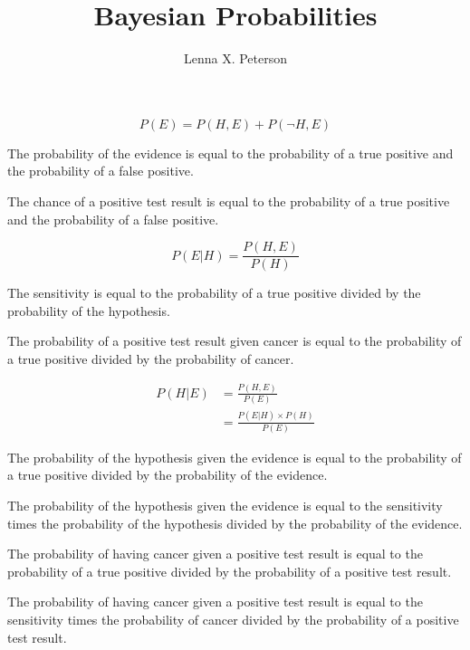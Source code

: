 \documentclass[12pt,a4paper]{article}
\author{Lenna X. Peterson}
\title{Bayesian Probabilities}
\begin{document}
\maketitle

\begin{equation}
P(E) = P(H,E) + P(\neg H, E)
\end{equation}

The probability of the evidence is equal to the probability of a true positive and the probability of a false positive.

The chance of a positive test result is equal to the probability of a true positive and the probability of a false positive.

\begin{equation}
P(E|H) = \frac{P(H,E)}{P(H)}
\end{equation}

The sensitivity is equal to the probability of a true positive divided by the probability of the hypothesis.

The probability of a positive test result given cancer is equal to the probability of a true positive divided by the probability of cancer.

\begin{align}
P(H|E) &= \frac{P(H,E)}{P(E)} \\
&= \frac{P(E|H) \times P(H)}{P(E)}
\end{align}

The probability of the hypothesis given the evidence is equal to the probability of a true positive divided by the probability of the evidence. 

The probability of the hypothesis given the evidence is equal to the sensitivity times the probability of the hypothesis divided by the probability of the evidence.

The probability of having cancer given a positive test result is equal to the probability of a true positive divided by the probability of a positive test result.

The probability of having cancer given a positive test result is equal to the sensitivity times the probability of cancer divided by the probability of a positive test result.
\end{document}
